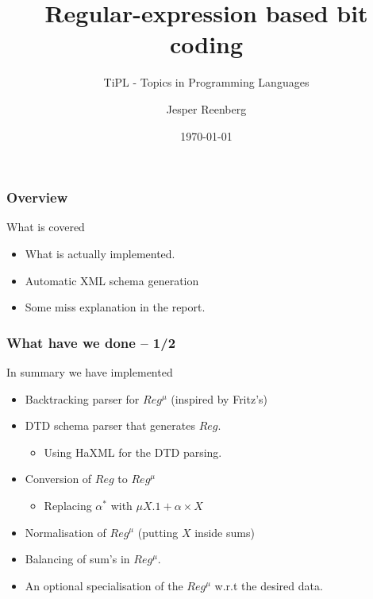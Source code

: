 \documentclass[slidestop,compress,mathserif, xcolor=table]{beamer}
\title[]{Regular-expression based bit coding}
\subtitle{\tiny{TiPL - Topics in Programming Languages}}
\author{Jesper Reenberg}
\institute[DIKU]{Department of Computer Science}
\date[]{\today}
\begin{document}
\frame[plain]{\titlepage}


\begin{frame}[c]
  \frametitle{Overview}

  What is covered

  \begin{itemize}
  \item What is actually implemented.

  \item Automatic XML schema generation

  \item Some miss explanation in the report.
  \end{itemize}
\end{frame}


\begin{frame}[c]
  \frametitle{What have we done -- 1/2}

  In summary we have implemented

  \begin{itemize}
  \item Backtracking parser for $Reg^\mu$ (inspired by Fritz's)

  \item DTD schema parser that generates $Reg$.
    \begin{itemize}
    \item Using HaXML for the DTD parsing.
    \end{itemize}

  \item Conversion of $Reg$ to $Reg^\mu$
    \begin{itemize}
    \item Replacing $\alpha^\ast$ with $\mu X . 1 + \alpha \times X$
    \end{itemize}

  \item Normalisation of $Reg^\mu$ (putting $X$ inside sums)

  \item Balancing of sum's in $Reg^\mu$.

  \item An optional specialisation of the $Reg^\mu$ w.r.t the desired data.

  \end{itemize}
\end{frame}
\end{document}
